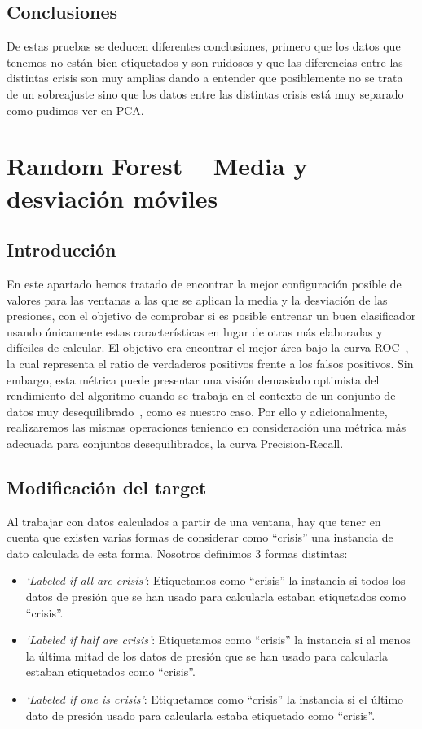 \documentclass[a4paper,12pt,twoside,oldfontcommands]{memoir}
\begin{document}
	\section{Conclusiones}
	De estas pruebas se deducen diferentes conclusiones, primero que los datos que tenemos no están bien etiquetados y son ruidosos y que las diferencias entre las distintas crisis son muy amplias dando a entender que posiblemente no se trata de un sobreajuste sino que los datos entre las distintas crisis está muy separado como pudimos ver en PCA.
	
	
	\chapter{Random Forest -- Media y desviación móviles} 
	\section{Introducción}
	En este apartado hemos tratado de encontrar la mejor configuración posible de valores para las ventanas a las que se aplican la media y la desviación de las presiones, con el objetivo de comprobar si es posible entrenar un buen clasificador usando únicamente estas características en lugar de otras más elaboradas y difíciles de calcular. El objetivo era encontrar el mejor área bajo la curva ROC~\cite{galar2012review}, la cual representa el ratio de verdaderos positivos frente a los falsos positivos. Sin embargo, esta métrica puede presentar una visión demasiado optimista del rendimiento del algoritmo cuando se trabaja en el contexto de un conjunto de datos muy desequilibrado~\cite{Davis2006RPR, saito2015pr}, como es nuestro caso. Por ello y adicionalmente, realizaremos las mismas operaciones teniendo en consideración una métrica más adecuada para conjuntos desequilibrados, la curva Precision-Recall. 
	
	\section{Modificación del target}
	Al trabajar con datos calculados a partir de una ventana, hay que tener en cuenta que existen varias formas de considerar como ``crisis'' una instancia de dato calculada de esta forma. Nosotros definimos 3 formas distintas: 
	
	\begin{itemize}
		\item \textit{`Labeled if all are crisis'}: Etiquetamos como ``crisis'' la instancia si todos los datos de presión que se han usado para calcularla estaban etiquetados como ``crisis''. 
		\item \textit{`Labeled if half are crisis'}: Etiquetamos como ``crisis'' la instancia si al menos la última mitad de los datos de presión que se han usado para calcularla estaban etiquetados como ``crisis''. 
		\item \textit{`Labeled if one is crisis'}: Etiquetamos como ``crisis'' la instancia si el último dato de presión usado para calcularla estaba etiquetado como ``crisis''. 
	\end{itemize}
	
\end{document}
